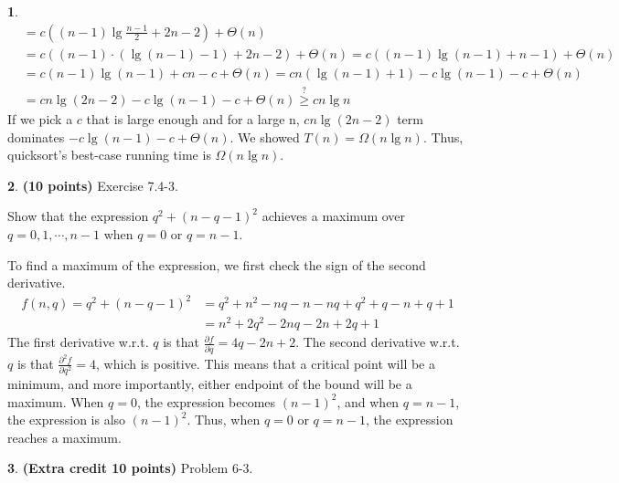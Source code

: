 \documentclass[11pt]{article}
\theoremstyle{definition}
\theoremstyle{theorem}
\newtheorem{prob}{}
\newcommand{\solution}{\medskip\noindent{\color{DarkBlue}\textbf{Solution:}}}
\begin{document}
\begin{prob}
\[\begin{split}
&= c ((n-1)\lg \frac{n-1}{2} + 2n - 2) + \Theta{(n)} \\
&= c ((n-1) \cdot (\lg (n-1) - 1) + 2n - 2) + \Theta{(n)} = c ((n-1) \lg (n-1) + n - 1) + \Theta{(n)} \\
&= c(n-1)\lg(n-1) + cn - c + \Theta{(n)} = cn (\lg(n-1) + 1) - c\lg(n-1) - c + \Theta{(n)} \\
&= cn\lg (2n - 2) - c\lg(n-1) - c + \Theta{(n)} \stackrel{?}{\ge} cn\lg n
\end{split}
\]
If we pick a $c$ that is large enough and for a large n, $cn\lg (2n - 2)$ term dominates $- c\lg(n-1) - c + \Theta{(n)}$. We showed $T(n) = \Omega{(n\lg n)}$. Thus, quicksort's best-case running time is $\Omega{(n\lg n)}$.
\end{prob}

\newpage
\begin{prob} \textbf{(10 points)} Exercise 7.4-3.

Show that the expression $q^2 + (n-q-1)^2$ achieves a maximum over $q = 0,1,\cdots,n-1$ when $q = 0$ or $q = n - 1$.

\solution

To find a maximum of the expression, we first check the sign of the second derivative.
\[
\begin{split}
f(n, q) = q^2 + (n-q-1)^2 &= q^2 + n^2 - nq -n - nq + q^2 + q - n + q + 1 \\
&= n^2 + 2q^2 - 2nq - 2n + 2q + 1
\end{split}
\]
The first derivative w.r.t. $q$ is that $\frac{\partial f}{\partial q} = 4q - 2n + 2$. The second derivative w.r.t. $q$ is that $\frac{\partial^2 f}{\partial q^2} = 4$, which is positive. This means that a critical point will be a minimum, and more importantly, either endpoint of the bound will be a maximum. When $q=0$, the expression becomes $(n-1)^2$, and when $q=n-1$, the expression is also $(n-1)^2$. Thus, when $q=0$ or $q=n-1$, the expression reaches a maximum.
\end{prob}

\newpage
\begin{prob} \textbf{(Extra credit 10 points)} Problem 6-3.
\end{prob}
\end{document}
